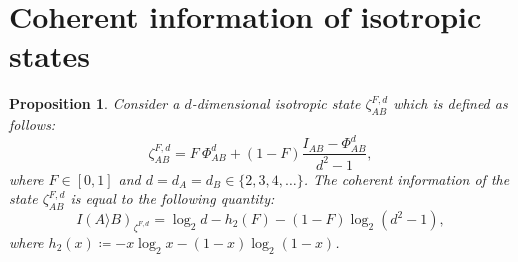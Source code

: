 \documentclass[twocolumn,letterpaper, dvipsnames,allowtoday, accepted = 2025-12-31]{quantumarticle}
\newtheorem{proposition}{Proposition}
\begin{document}
\section{Coherent information of isotropic states}\label{app:coherent_info_iso_proof}

\begin{proposition}
    Consider a $d$-dimensional isotropic state $\zeta^{F,d}_{AB}$ which is defined as follows:
    \begin{equation}
        \zeta^{F,d}_{AB} = F~\Phi^d_{AB} + (1-F)\frac{I_{AB}-\Phi^d_{AB}}{d^2-1},
    \end{equation}
    where $F\in [0,1]$ and $d = d_A = d_B \in \{2,3,4, \ldots\}$. The coherent information of the state $\zeta^{F,d}_{AB}$ is equal to the following quantity:
    \begin{equation}\label{eq:coherent_info_iso}
        I\!\left(A\rangle B\right)_{\zeta^{F,d}} = \log_2 d - h_2(F) - (1-F)\log_2(d^2-1),
    \end{equation}
    where $h_2(x) \coloneqq -x\log_2 x - (1-x)\log_2(1-x)$.
\end{proposition}
\end{document}
